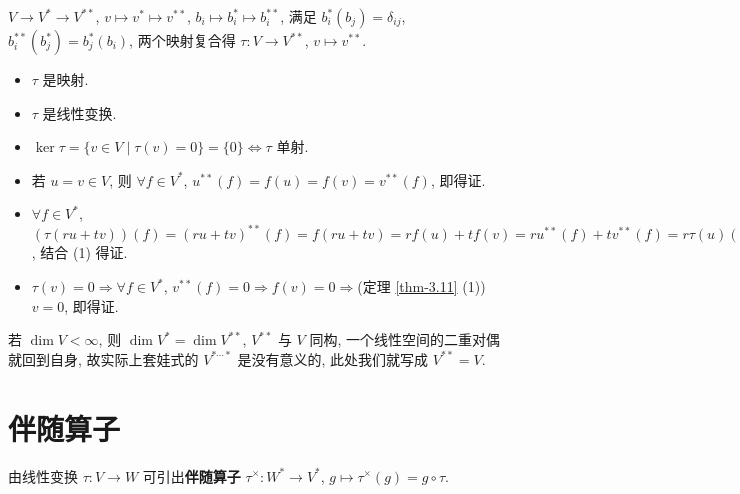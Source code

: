 \documentclass{note}
\begin{document}
$V\rightarrow V^*\rightarrow V^{**}$, $v\mapsto v^*\mapsto v^{**}$, $b_i\mapsto b_i^*\mapsto b_i^{**}$, 满足 $b_i^*(b_j)=\delta_{ij}$, $b_i^{**}(b_j^*)=b_j^*(b_i)$, 两个映射复合得 $\tau:V\rightarrow V^{**}$, $v\mapsto v^{**}$.

\begin{itemize}
    \item[(1)] $\tau$ 是映射.
    \item[(2)] $\tau$ 是线性变换.
    \item[(3)] $\ker\tau=\{v\in V\mid\tau(v)=0\}=\{0\}\Longleftrightarrow\tau$ 单射.
\end{itemize}
\begin{pf}
    \begin{itemize}
        \item[(1)] 若 $u=v\in V$, 则 $\forall f\in V^*$, $u^{**}(f)=f(u)=f(v)=v^{**}(f)$, 即得证.
        \item[(2)] $\forall f\in V^*$, $(\tau(ru+tv))(f)=(ru+tv)^{**}(f)=f(ru+tv)=rf(u)+tf(v)=ru^{**}(f)+tv^{**}(f)=r\tau(u)(f)+t\tau(v)(f)=(r\tau(u)+t\tau(v))(f)\Longrightarrow\tau(ru+tv)=r\tau(u)+t\tau(v)$, 结合 (1) 得证.
        \item[(3)] $\tau(v)=0\Longrightarrow\forall f\in V^*$, $v^{**}(f)=0\Longrightarrow f(v)=0\Longrightarrow$(定理 \ref{thm-3.11} (1)) $v=0$, 即得证.
    \end{itemize}
\end{pf}

\begin{cor}[(课本引理 3.13)]
    若 $\dim V<\infty$, 则 $\dim V^*=\dim V^{**}$, $V^{**}$ 与 $V$ 同构, 一个线性空间的二重对偶就回到自身, 故实际上套娃式的 $V^{*\cdots*}$ 是没有意义的, 此处我们就写成 $V^{**}=V$.
\end{cor}

\section{伴随算子}
\begin{df}[伴随算子]
    由线性变换 $\tau:V\rightarrow W$ 可引出\textbf{伴随算子} $\tau^{\times}:W^*\rightarrow V^*$, $g\mapsto\tau^{\times}(g)=g\circ\tau$.
    \begin{center}
    \end{center}
\end{df}
\end{document}
